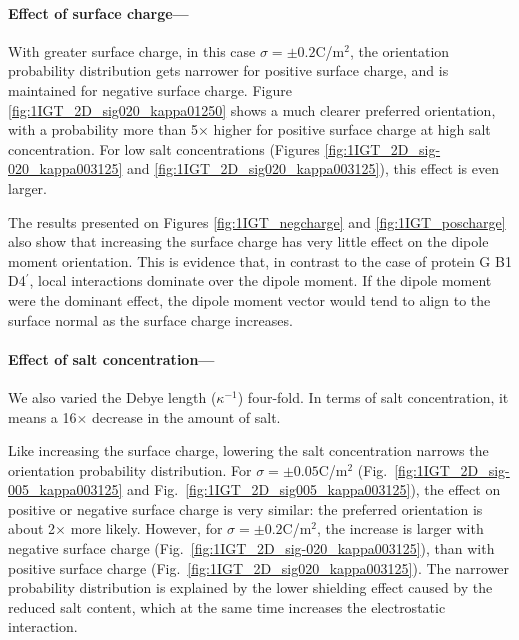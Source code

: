  \medskip
 
 \paragraph*{Effect of surface charge---}
 
 With greater surface charge, in this case $\sigma=\pm0.2$C/m$^2$, the orientation probability distribution gets narrower for positive surface charge, and is maintained for negative surface charge. Figure \ref{fig:1IGT_2D_sig020_kappa01250} shows a much clearer preferred orientation, with a probability more than 5$\times$ higher for positive surface charge at high salt concentration. For low salt concentrations (Figures \ref{fig:1IGT_2D_sig-020_kappa003125} and \ref{fig:1IGT_2D_sig020_kappa003125}), this effect is even larger. 
 
The results presented on Figures \ref{fig:1IGT_negcharge} and \ref{fig:1IGT_poscharge} also show that increasing the surface charge has very little effect on the dipole moment orientation. This is evidence that, in contrast to the case of protein G B1 D4$^\prime$, local interactions dominate over the dipole moment. If the dipole moment were the dominant effect, the dipole moment vector would tend to align to the surface normal as the surface charge increases.
 
 \medskip
 
 \paragraph*{Effect of salt concentration---}
 
 We also varied the Debye length ($\kappa^{-1}$) four-fold. In terms of salt concentration, it means a 16$\times$ decrease in the amount of salt. 
 
 Like increasing the surface charge, lowering the salt concentration narrows the orientation probability distribution. For $\sigma=\pm0.05$C/m$^2$ (Fig.~\ref{fig:1IGT_2D_sig-005_kappa003125} and Fig.~\ref{fig:1IGT_2D_sig005_kappa003125}), the effect on positive or negative surface charge is very similar: the preferred orientation is about 2$\times$ more likely. However, for $\sigma=\pm0.2$C/m$^2$, the increase is larger with negative surface charge (Fig.~\ref{fig:1IGT_2D_sig-020_kappa003125}), than with positive surface charge (Fig.~\ref{fig:1IGT_2D_sig020_kappa003125}). The narrower probability distribution is explained by the lower shielding effect caused by the reduced salt content, which at the same time increases the electrostatic interaction.

